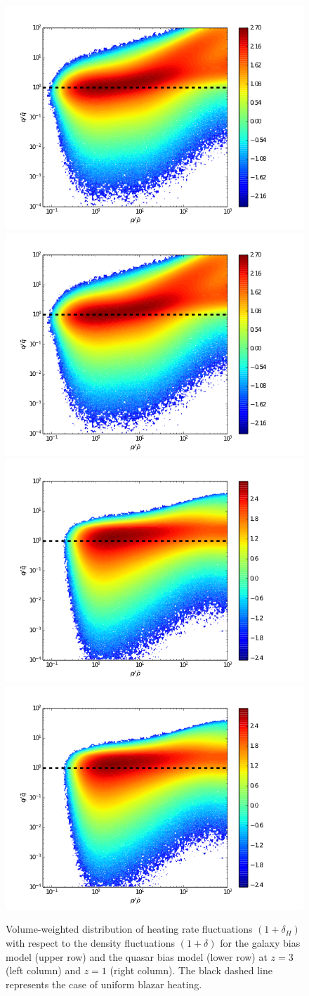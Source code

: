 \documentclass[twocolumns]{emulateapj}
\begin{document}
\begin{figure}[h]
\centering
\includegraphics[width = .23\textwidth ]{delta_deltah_z1_gal2_ok.png}
\includegraphics[width = .23\textwidth ]{delta_deltah_z1_gal2_ok.png}\\
\includegraphics[width = .23\textwidth ]{delta_deltah_z3_qso4_512b.png}
\includegraphics[width = .23\textwidth ]{delta_deltah_z3_qso4_512b.png}
\caption{Volume-weighted distribution of heating rate fluctuations $(1+\delta_H)$ with respect to the density fluctuations $(1+\delta)$ for the galaxy bias model (upper row) and the quasar bias model (lower row) at $z=3$ (left column) and $z=1$ (right column). The black dashed line represents the case of uniform blazar heating.}
\label{fig:deltas}
\end{figure}
\end{document}
